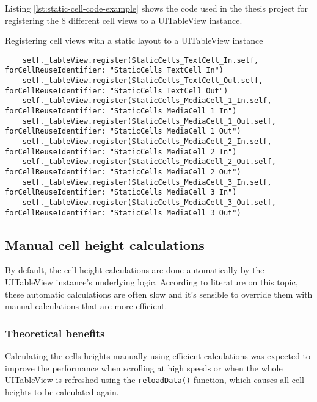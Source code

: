\documentclass[a4paper,12pt]{article}
\begin{document}
Listing \autoref{lst:static-cell-code-example} shows the code used in the thesis project for registering the 8 different cell views to a UITableView instance.
\begin{listing}[H]
  \caption{Registering cell views with a static layout to a UITableView instance}
  \label{lst:static-cell-code-example}
  \begin{verbatim}
    self._tableView.register(StaticCells_TextCell_In.self, forCellReuseIdentifier: "StaticCells_TextCell_In")
    self._tableView.register(StaticCells_TextCell_Out.self, forCellReuseIdentifier: "StaticCells_TextCell_Out")
    self._tableView.register(StaticCells_MediaCell_1_In.self, forCellReuseIdentifier: "StaticCells_MediaCell_1_In")
    self._tableView.register(StaticCells_MediaCell_1_Out.self, forCellReuseIdentifier: "StaticCells_MediaCell_1_Out")
    self._tableView.register(StaticCells_MediaCell_2_In.self, forCellReuseIdentifier: "StaticCells_MediaCell_2_In")
    self._tableView.register(StaticCells_MediaCell_2_Out.self, forCellReuseIdentifier: "StaticCells_MediaCell_2_Out")
    self._tableView.register(StaticCells_MediaCell_3_In.self, forCellReuseIdentifier: "StaticCells_MediaCell_3_In")
    self._tableView.register(StaticCells_MediaCell_3_Out.self, forCellReuseIdentifier: "StaticCells_MediaCell_3_Out")
  \end{verbatim}
\end{listing}

\subsection{Manual cell height calculations}
\label{subsec:manual-cell-height-calculations}
By default, the cell height calculations are done automatically by the UITableView instance's underlying logic. According to literature on this topic, these automatic calculations are often slow and it's sensible to override them with manual calculations that are more efficient.\cite{PerfectSmoothScrollingInUITableViews}\cite{HowToMakeDynamicTableViewCellHeight}\cite{MediumSmoothScrollPrearo}

\subsubsection{Theoretical benefits}
Calculating the cells heights manually using efficient calculations was expected to improve the performance when scrolling at high speeds or when the whole UITableView is refreshed using the \texttt{reloadData()} function, which causes all cell heights to be calculated again\cite{ReloadDataHeights}.
\end{document}
